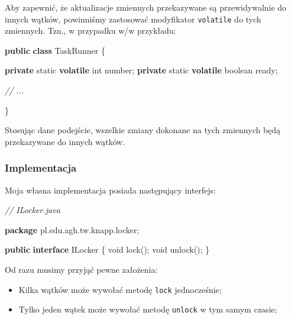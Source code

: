 \documentclass[11pt]{article}
\providecommand{\tightlist}{%
      \setlength{\itemsep}{0pt}\setlength{\parskip}{0pt}}
\newenvironment{Shaded}{}{}
\newcommand{\KeywordTok}[1]{\textcolor[rgb]{0.00,0.44,0.13}{\textbf{{#1}}}}
\newcommand{\DataTypeTok}[1]{\textcolor[rgb]{0.56,0.13,0.00}{{#1}}}
\newcommand{\CommentTok}[1]{\textcolor[rgb]{0.38,0.63,0.69}{\textit{{#1}}}}
\newcommand{\FunctionTok}[1]{\textcolor[rgb]{0.02,0.16,0.49}{{#1}}}
\newcommand{\NormalTok}[1]{{#1}}
\newcommand{\ImportTok}[1]{{#1}}
\newcommand{\OperatorTok}[1]{\textcolor[rgb]{0.40,0.40,0.40}{{#1}}}
\begin{document}
Aby zapewnić, że aktualizacje zmiennych przekazywane są przewidywalnie
do innych wątków, powinniśmy zastosować modyfikator \texttt{volatile} do
tych zmiennych. Tzn., w przypadku w/w przykładu:

\begin{Shaded}
\begin{Highlighting}[]
\KeywordTok{public} \KeywordTok{class}\NormalTok{ TaskRunner }\OperatorTok{\{}

    \KeywordTok{private} \DataTypeTok{static} \KeywordTok{volatile} \DataTypeTok{int}\NormalTok{ number}\OperatorTok{;}
    \KeywordTok{private} \DataTypeTok{static} \KeywordTok{volatile} \DataTypeTok{boolean}\NormalTok{ ready}\OperatorTok{;}

    \CommentTok{// ...}

\OperatorTok{\}}
\end{Highlighting}
\end{Shaded}

Stosując dane podejście, wszelkie zmiany dokonane na tych zmiennych będą
przekazywane do innych wątków.

\hypertarget{implementacja}{%
\subsubsection{Implementacja}\label{implementacja}}

Moja własna implementacja posiada następujący interfejs:

\begin{Shaded}
\begin{Highlighting}[]
\CommentTok{// ILocker.java}

\KeywordTok{package}\ImportTok{ pl}\OperatorTok{.}\ImportTok{edu}\OperatorTok{.}\ImportTok{agh}\OperatorTok{.}\ImportTok{tw}\OperatorTok{.}\ImportTok{knapp}\OperatorTok{.}\ImportTok{locker}\OperatorTok{;}

\KeywordTok{public} \KeywordTok{interface}\NormalTok{ ILocker }\OperatorTok{\{}
    \DataTypeTok{void} \FunctionTok{lock}\OperatorTok{();}
    \DataTypeTok{void} \FunctionTok{unlock}\OperatorTok{();}
\OperatorTok{\}}
\end{Highlighting}
\end{Shaded}

Od razu musimy przyjąć pewne założenia:

\begin{itemize}
\tightlist
\item
  Kilka wątków może wywołać metodę \texttt{lock} jednocześnie;
\item
  Tylko jeden wątek może wywołać metodę \texttt{unlock} w tym samym
  czasie;
\end{itemize}
\end{document}
